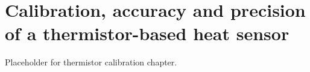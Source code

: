 \setchapterpreamble[u]{\margintoc}
\chapter{Calibration, accuracy and precision of a thermistor-based heat sensor}

Placeholder for thermistor calibration chapter.
